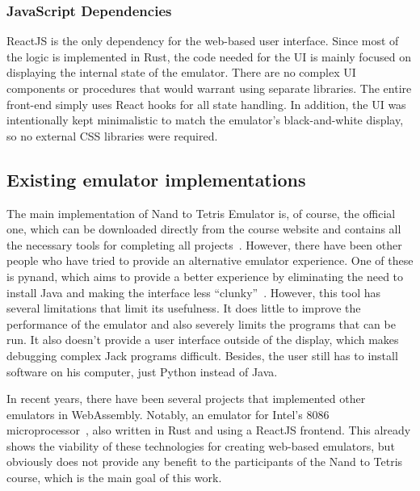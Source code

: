 \subsubsection{JavaScript Dependencies}
ReactJS is the only dependency for the web-based user interface.
Since most of the logic is implemented in Rust, the code needed for the UI is mainly focused on displaying the internal state of the emulator. There are no complex UI components or procedures that would warrant using separate libraries.
The entire front-end simply uses React hooks for all state handling.
In addition, the UI was intentionally kept minimalistic to match the emulator's black-and-white display, so no external CSS libraries were required.

\subsection{Existing emulator implementations}
The main implementation of Nand to Tetris Emulator is, of course, the official one, which can be downloaded directly from the course website and contains all the necessary tools for completing all projects~\cite[Software]{n2tweb}.
However, there have been other people who have tried to provide an alternative emulator experience. One of these is pynand, which aims to provide a better experience by eliminating the need to install Java and making the interface less ``clunky''~\cite{pynand}. However, this tool has several limitations that limit its usefulness. It does little to improve the performance of the emulator and also severely limits the programs that can be run. It also doesn't provide a user interface outside of the display, which makes debugging complex Jack programs difficult. Besides, the user still has to install software on his computer, just Python instead of Java.


In recent years, there have been several projects that implemented other emulators in WebAssembly. Notably, an emulator for Intel's 8086 microprocessor~\cite{9824078}, also written in Rust and using a ReactJS frontend. This already shows the viability of these technologies for creating web-based emulators, but obviously does not provide any benefit to the participants of the Nand to Tetris course, which is the main goal of this work.

